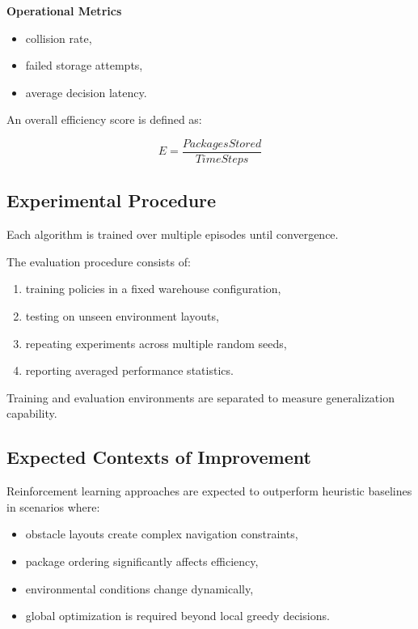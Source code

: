 \documentclass{article}
\begin{document}
\textbf{Operational Metrics}
\begin{itemize}
    \item collision rate,
    \item failed storage attempts,
    \item average decision latency.
\end{itemize}

An overall efficiency score is defined as:

\begin{equation}
E= \frac{{Packages Stored}}{{TimeSteps}}
\end{equation}

\subsection{Experimental Procedure}

Each algorithm is trained over multiple episodes until convergence.

The evaluation procedure consists of:

\begin{enumerate}
    \item training policies in a fixed warehouse configuration,
    \item testing on unseen environment layouts,
    \item repeating experiments across multiple random seeds,
    \item reporting averaged performance statistics.
\end{enumerate}

Training and evaluation environments are separated to measure generalization capability.

\subsection{Expected Contexts of Improvement}

Reinforcement learning approaches are expected to outperform heuristic baselines in scenarios where:

\begin{itemize}
    \item obstacle layouts create complex navigation constraints,
    \item package ordering significantly affects efficiency,
    \item environmental conditions change dynamically,
    \item global optimization is required beyond local greedy decisions.
\end{itemize}
\end{document}
